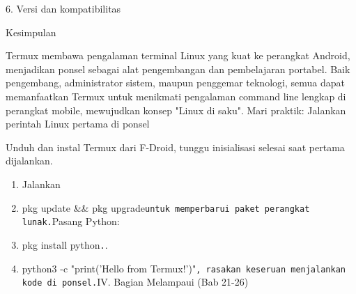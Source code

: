 6. Versi dan kompatibilitas


Kesimpulan

\begin{tcbinfo}{Termux membawa pengalaman terminal Linux yang kuat ke perangkat Android, menjadikan ponsel sebagai alat pengembangan dan pembelajaran portabel. Baik pengembang, administrator sistem, maupun penggemar teknologi, semua dapat memanfaatkan Termux untuk menikmati pengalaman command line lengkap di perangkat mobile, mewujudkan konsep "Linux di saku".}
Mari praktik: Jalankan perintah Linux pertama di ponsel

\end{tcbinfo}

\begin{tcbpractice}{Unduh dan instal Termux dari F-Droid, tunggu inisialisasi selesai saat pertama dijalankan.}
\begin{enumerate}
  \item Jalankan
  \item pkg update \&\& pkg upgrade\texttt{untuk memperbarui paket perangkat lunak.\allowbreak }Pasang Python:
  \item pkg install python\texttt{.\allowbreak }.
  \item python3 -c "print('Hello from Termux!')"\texttt{, rasakan keseruan menjalankan kode di ponsel.\allowbreak }IV. Bagian Melampaui (Bab 21-26)
\end{enumerate}

\end{tcbpractice}
